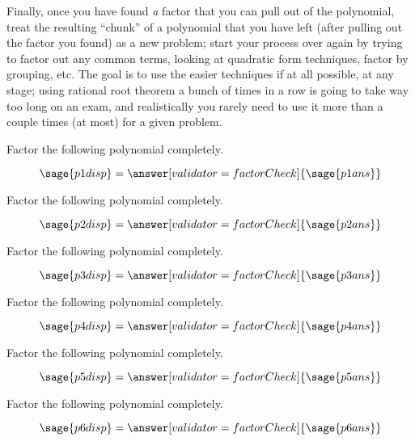 \documentclass{ximera}
\begin{document}
Finally, once you have found \textit{a} factor that you can pull out of the polynomial, treat the resulting ``chunk'' of a polynomial that you have left (after pulling out the factor you found) as a new problem; start your process over again by trying to factor out any common terms, looking at quadratic form techniques, factor by grouping, etc. The goal is to use the easier techniques if at all possible, at any stage; using rational root theorem a bunch of times in a row is going to take way too long on an exam, and realistically you rarely need to use it more than a couple times (at most) for a given problem.

\begin{problem}
    Factor the following polynomial completely.

\[
    \sage{p1disp} = \answer[validator=factorCheck]{\sage{p1ans}}
\]
\end{problem}




\begin{problem}
    Factor the following polynomial completely.

\[
    \sage{p2disp} = \answer[validator=factorCheck]{\sage{p2ans}}
\]
\end{problem}




\begin{problem}
    Factor the following polynomial completely.

\[
    \sage{p3disp} = \answer[validator=factorCheck]{\sage{p3ans}}
\]
\end{problem}




\begin{problem}
    Factor the following polynomial completely.

\[
    \sage{p4disp} = \answer[validator=factorCheck]{\sage{p4ans}}
\]
\end{problem}




\begin{problem}
    Factor the following polynomial completely.

\[
    \sage{p5disp} = \answer[validator=factorCheck]{\sage{p5ans}}
\]
\end{problem}




\begin{problem}
    Factor the following polynomial completely.

\[
    \sage{p6disp} = \answer[validator=factorCheck]{\sage{p6ans}}
\]
\end{problem}
\end{document}

